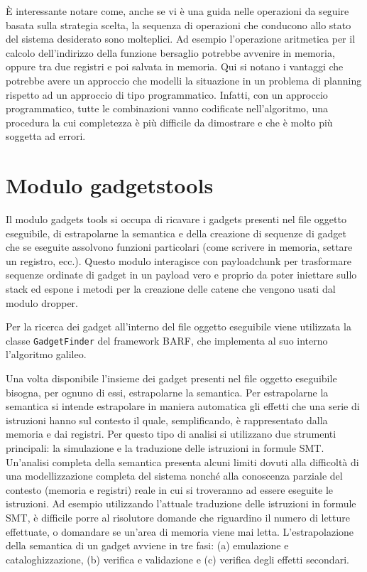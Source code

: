 È interessante notare come, anche se vi è una guida nelle operazioni
da seguire basata sulla strategia scelta, la sequenza di operazioni
che conducono allo stato del sistema desiderato sono molteplici. Ad
esempio l'operazione aritmetica per il calcolo dell'indirizzo della
funzione bersaglio potrebbe avvenire in memoria, oppure tra due
registri e poi salvata in memoria. Qui si notano i vantaggi che
potrebbe avere un approccio che modelli la situazione in un problema
di planning rispetto ad un approccio di tipo programmatico. Infatti,
con un approccio programmatico, tutte le combinazioni vanno codificate
nell'algoritmo, una procedura la cui completezza è più difficile da
dimostrare e che è molto più soggetta ad errori.

\section{Modulo gadgetstools}

Il modulo gadgets tools si occupa di ricavare i gadgets presenti nel
file oggetto eseguibile, di estrapolarne la semantica e della
creazione di sequenze di gadget che se eseguite assolvono funzioni
particolari (come scrivere in memoria, settare un registro,
ecc.). Questo modulo interagisce con payloadchunk per trasformare
sequenze ordinate di gadget in un payload vero e proprio da poter
iniettare sullo stack ed espone i metodi per la creazione delle catene
che vengono usati dal modulo dropper.

Per la ricerca dei gadget all'interno del file oggetto eseguibile
viene utilizzata la classe \lstinline{GadgetFinder} del framework
BARF, che implementa al suo interno l'algoritmo galileo\cite{roemer-12}. 


Una volta disponibile l'insieme dei gadget presenti nel file oggetto
eseguibile bisogna, per ognuno di essi, estrapolarne la semantica. Per
estrapolarne la semantica si intende estrapolare in maniera automatica
gli effetti che una serie di istruzioni hanno sul contesto il quale,
semplificando, è rappresentato dalla memoria e dai registri. Per
questo tipo di analisi si utilizzano due strumenti principali: la
simulazione e la traduzione delle istruzioni in formule
SMT. Un'analisi completa della semantica presenta alcuni limiti dovuti
alla difficoltà di una modellizzazione completa del sistema nonché
alla conoscenza parziale del contesto (memoria e registri) reale in
cui si troveranno ad essere eseguite le istruzioni. Ad esempio
utilizzando l'attuale traduzione delle istruzioni in formule SMT, è
difficile porre al risolutore domande che riguardino il numero di
letture effettuate, o domandare se un'area di memoria viene mai
letta. L'estrapolazione della semantica di un gadget avviene in tre
fasi: (a) emulazione e cataloghizzazione, (b) verifica e validazione e
(c) verifica degli effetti secondari.

